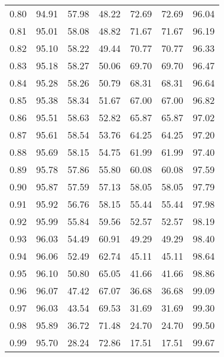 \begin{tabular}{|c|c|c|c|c|c|c|}
      0.80 &     94.91 &     57.98 &      48.22 &   72.69 &      72.69 &         96.04 \\
      0.81 &     95.01 &     58.08 &      48.82 &   71.67 &      71.67 &         96.19 \\
      0.82 &     95.10 &     58.22 &      49.44 &   70.77 &      70.77 &         96.33 \\
      0.83 &     95.18 &     58.27 &      50.06 &   69.70 &      69.70 &         96.47 \\
      0.84 &     95.28 &     58.26 &      50.79 &   68.31 &      68.31 &         96.64 \\
      0.85 &     95.38 &     58.34 &      51.67 &   67.00 &      67.00 &         96.82 \\
      0.86 &     95.51 &     58.63 &      52.82 &   65.87 &      65.87 &         97.02 \\
      0.87 &     95.61 &     58.54 &      53.76 &   64.25 &      64.25 &         97.20 \\
      0.88 &     95.69 &     58.15 &      54.75 &   61.99 &      61.99 &         97.40 \\
      0.89 &     95.78 &     57.86 &      55.80 &   60.08 &      60.08 &         97.59 \\
      0.90 &     95.87 &     57.59 &      57.13 &   58.05 &      58.05 &         97.79 \\
      0.91 &     95.92 &     56.76 &      58.15 &   55.44 &      55.44 &         97.98 \\
      0.92 &     95.99 &     55.84 &      59.56 &   52.57 &      52.57 &         98.19 \\
      0.93 &     96.03 &     54.49 &      60.91 &   49.29 &      49.29 &         98.40 \\
      0.94 &     96.06 &     52.49 &      62.74 &   45.11 &      45.11 &         98.64 \\
      0.95 &     96.10 &     50.80 &      65.05 &   41.66 &      41.66 &         98.86 \\
      0.96 &     96.07 &     47.42 &      67.07 &   36.68 &      36.68 &         99.09 \\
      0.97 &     96.03 &     43.54 &      69.53 &   31.69 &      31.69 &         99.30 \\
      0.98 &     95.89 &     36.72 &      71.48 &   24.70 &      24.70 &         99.50 \\
      0.99 &     95.70 &     28.24 &      72.86 &   17.51 &      17.51 &         99.67 \\
\bottomrule
\end{tabular}
